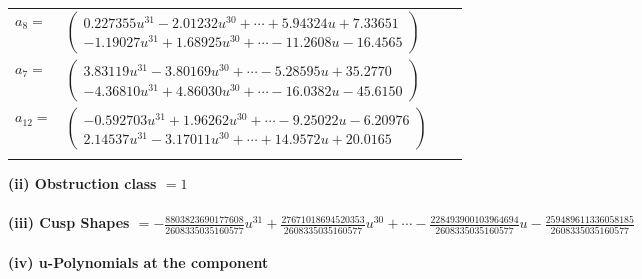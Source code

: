 \documentclass[1p]{elsarticle_modified}
\theoremstyle{definition}
\begin{document}
\begin{tabular}{m{7pt} m{180pt} m{7pt} m{180pt} }
\flushright $a_{8}=$&$\begin{pmatrix}0.227355 u^{31}-2.01232 u^{30}+\cdots+5.94324 u+7.33651\\-1.19027 u^{31}+1.68925 u^{30}+\cdots-11.2608 u-16.4565\end{pmatrix}$ \\
\flushright $a_{7}=$&$\begin{pmatrix}3.83119 u^{31}-3.80169 u^{30}+\cdots-5.28595 u+35.2770\\-4.36810 u^{31}+4.86030 u^{30}+\cdots-16.0382 u-45.6150\end{pmatrix}$ \\
\flushright $a_{12}=$&$\begin{pmatrix}-0.592703 u^{31}+1.96262 u^{30}+\cdots-9.25022 u-6.20976\\2.14537 u^{31}-3.17011 u^{30}+\cdots+14.9572 u+20.0165\end{pmatrix}$\\&\end{tabular}
\flushleft \textbf{(ii) Obstruction class $= 1$}\\~\\
\flushleft \textbf{(iii) Cusp Shapes $= -\frac{8803823690177608}{2608335035160577} u^{31}+\frac{27671018694520353}{2608335035160577} u^{30}+\cdots-\frac{228493900103964694}{2608335035160577} u-\frac{259489611336058185}{2608335035160577}$}\\~\\
\newpage\renewcommand{\arraystretch}{1}
\flushleft \textbf{(iv) u-Polynomials at the component}\newline \\
\end{document}
